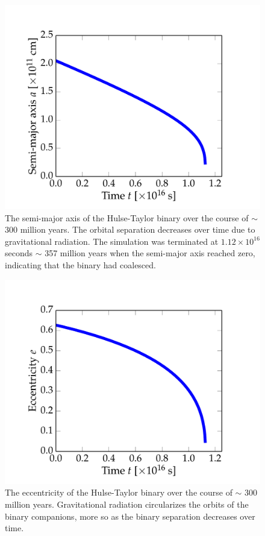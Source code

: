 \documentclass[preprint2]{aastex}
\begin{document}
\begin{figure}[t!]
\vspace{-0.24cm}
\centering
\hspace*{-1cm}\includegraphics[width=1.2\textwidth]{billion_figs/semi-major-axis.pdf}
\caption{The semi-major axis of the Hulse-Taylor binary over the course of \(\sim\) 300 million years. The orbital separation decreases over time due to gravitational radiation. The simulation was terminated at \(1.12 \times 10^{16}\) seconds \(\sim\) 357 million years when the semi-major axis reached zero, indicating that the binary had coalesced.}
\label{billion-axis}
\end{figure}

\begin{figure}[t!]
\vspace{-0.24cm}
\centering
\hspace*{-1cm}\includegraphics[width=1.2\textwidth]{billion_figs/eccentricity.pdf}
\caption{The eccentricity of the Hulse-Taylor binary over the course of \(\sim\) 300 million years. Gravitational radiation circularizes the orbits of the binary companions, more so as the binary separation decreases over time.}
\label{billion-ecc}
\end{figure}
\end{document}
